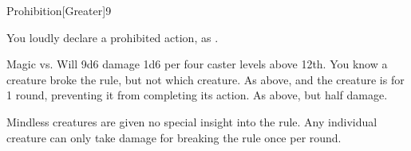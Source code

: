 \begin{spellsection}{Prohibition}[Greater]{9}
\begin{spellheader}
\end{spellheader}
\begin{spellcontent}
    \spelleffect You loudly declare a prohibited action, as .
    \spelldur \durshort
\end{spellcontent}
\begin{spellsubcontent}
    \begin{spelltargetinginfo}
    \end{spelltargetinginfo}
    \begin{spelleffects}
        \begin{spellattack}{Magic vs. Will}
            \spellsuccess 9d6 damage \add 1d6 per four caster levels above 12th. You know a creature broke the rule, but not which creature.
            \spellcritical As above, and the creature is \stunned for 1 round, preventing it from completing its action.
            \spellfailure As above, but half damage.
        \end{spellattack}
    \end{spelleffects}
\end{spellsubcontent}
\begin{spellfooter}
    \spellnotes Mindless creatures are given no special insight into the rule. Any individual creature can only take damage for breaking the rule once per round.
\end{spellfooter}
\end{spellsection}

